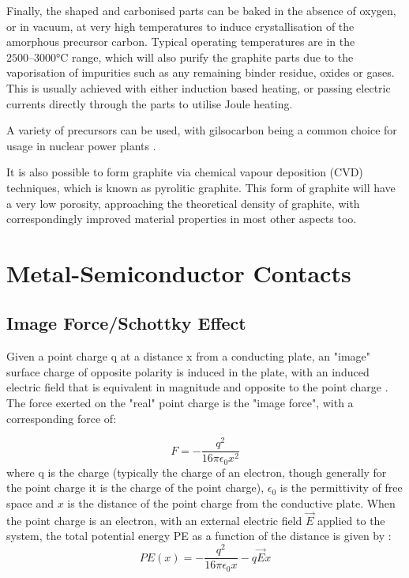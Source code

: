 \begin{refsection}
Finally, the shaped and carbonised parts can be baked in the absence of oxygen, or in vacuum, at very high temperatures to induce crystallisation of the amorphous precursor carbon. Typical operating temperatures are in the $2500\text{--}3000\si{\degreeCelsius}$ range, which will also purify the graphite parts due to the vaporisation of impurities such as any remaining binder residue, oxides or gases. This is usually achieved with either induction based heating, or passing electric currents directly through the parts to utilise Joule heating.

A variety of precursors can be used, with gilsocarbon being a common choice for usage in nuclear power plants \cite{liu2017}.

It is also possible to form graphite via chemical vapour deposition (CVD) techniques, which is known as pyrolitic graphite. This form of graphite will have a very low porosity, approaching the theoretical density of graphite, with correspondingly improved material properties in most other aspects too.

\section{Metal-Semiconductor Contacts}

\subsection{Image Force/Schottky Effect}
\label{subsec:image_force_effect_schottky_effect}
 Given a point charge q at a distance x from a conducting plate, an "image" surface charge of opposite polarity is induced in the plate, with an induced electric field that is equivalent in magnitude and opposite to the point charge \cite{Feynman1965}. The force exerted on the "real" point charge is the "image force", with a corresponding force of:

\begin{equation}
\label{eq:image_charge_pe}
    F = -\frac{q^{2}}{16\pi \epsilon_{0}x^{2}}
\end{equation}
 where q is the charge (typically the charge of an electron, though generally for the point charge it is the charge of the point charge), $\epsilon_{0}$ is the permittivity of free space and $x$ is the distance of the point charge from the conductive plate. When the point charge is an electron, with an external electric field $\vec{E}$ applied to the system, the total potential energy PE as a function of the distance is given by \cite{Schroder2006-sx}:
 \begin{equation}
 \label{eq:pe_image}
     PE(x) = -\frac{q^{2}}{16\pi \epsilon_{0}x} - q\vec{E}x
 \end{equation}


\end{refsection}
